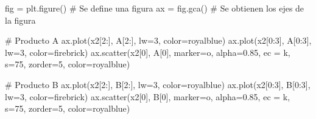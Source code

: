\documentclass[
  letterpaper,
  DIV=11,
  numbers=noendperiod]{scrreprt}
\newenvironment{Shaded}{\begin{snugshade}}{\end{snugshade}}
\newcommand{\CommentTok}[1]{\textcolor[rgb]{0.37,0.37,0.37}{#1}}
\newcommand{\DecValTok}[1]{\textcolor[rgb]{0.68,0.00,0.00}{#1}}
\newcommand{\FloatTok}[1]{\textcolor[rgb]{0.68,0.00,0.00}{#1}}
\newcommand{\NormalTok}[1]{\textcolor[rgb]{0.00,0.23,0.31}{#1}}
\newcommand{\OperatorTok}[1]{\textcolor[rgb]{0.37,0.37,0.37}{#1}}
\newcommand{\StringTok}[1]{\textcolor[rgb]{0.13,0.47,0.30}{#1}}
\begin{document}
\begin{Shaded}
\begin{Highlighting}[]
\NormalTok{fig }\OperatorTok{=}\NormalTok{ plt.figure() }\CommentTok{\# Se define una figura}
\NormalTok{ax }\OperatorTok{=}\NormalTok{ fig.gca()     }\CommentTok{\# Se obtienen los ejes de la figura}

\CommentTok{\# Producto A}
\NormalTok{ax.plot(x2[}\DecValTok{2}\NormalTok{:], A[}\DecValTok{2}\NormalTok{:], lw}\OperatorTok{=}\DecValTok{3}\NormalTok{, color}\OperatorTok{=}\StringTok{\textquotesingle{}royalblue\textquotesingle{}}\NormalTok{)}
\NormalTok{ax.plot(x2[}\DecValTok{0}\NormalTok{:}\DecValTok{3}\NormalTok{], A[}\DecValTok{0}\NormalTok{:}\DecValTok{3}\NormalTok{], lw}\OperatorTok{=}\DecValTok{3}\NormalTok{, color}\OperatorTok{=}\StringTok{\textquotesingle{}firebrick\textquotesingle{}}\NormalTok{)}
\NormalTok{ax.scatter(x2[}\DecValTok{0}\NormalTok{], A[}\DecValTok{0}\NormalTok{], marker}\OperatorTok{=}\StringTok{\textquotesingle{}o\textquotesingle{}}\NormalTok{, alpha}\OperatorTok{=}\FloatTok{0.85}\NormalTok{, ec }\OperatorTok{=} \StringTok{\textquotesingle{}k\textquotesingle{}}\NormalTok{, s}\OperatorTok{=}\DecValTok{75}\NormalTok{, zorder}\OperatorTok{=}\DecValTok{5}\NormalTok{, color}\OperatorTok{=}\StringTok{\textquotesingle{}royalblue\textquotesingle{}}\NormalTok{)}

\CommentTok{\# Producto B}
\NormalTok{ax.plot(x2[}\DecValTok{2}\NormalTok{:], B[}\DecValTok{2}\NormalTok{:], lw}\OperatorTok{=}\DecValTok{3}\NormalTok{, color}\OperatorTok{=}\StringTok{\textquotesingle{}royalblue\textquotesingle{}}\NormalTok{)}
\NormalTok{ax.plot(x2[}\DecValTok{0}\NormalTok{:}\DecValTok{3}\NormalTok{], B[}\DecValTok{0}\NormalTok{:}\DecValTok{3}\NormalTok{], lw}\OperatorTok{=}\DecValTok{3}\NormalTok{, color}\OperatorTok{=}\StringTok{\textquotesingle{}firebrick\textquotesingle{}}\NormalTok{)}
\NormalTok{ax.scatter(x2[}\DecValTok{0}\NormalTok{], B[}\DecValTok{0}\NormalTok{], marker}\OperatorTok{=}\StringTok{\textquotesingle{}o\textquotesingle{}}\NormalTok{, alpha}\OperatorTok{=}\FloatTok{0.85}\NormalTok{, ec }\OperatorTok{=} \StringTok{\textquotesingle{}k\textquotesingle{}}\NormalTok{, s}\OperatorTok{=}\DecValTok{75}\NormalTok{, zorder}\OperatorTok{=}\DecValTok{5}\NormalTok{, color}\OperatorTok{=}\StringTok{\textquotesingle{}royalblue\textquotesingle{}}\NormalTok{)}


\end{Highlighting}
\end{Shaded}
\end{document}

